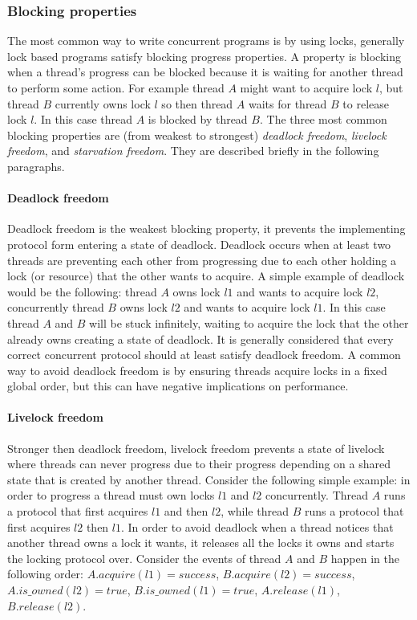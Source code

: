 \subsubsection{Blocking properties}
The most common way to write concurrent programs is by using locks,
generally lock based programs satisfy blocking progress properties.
A property is blocking when a thread's progress can be blocked because it is waiting
for another thread to perform some action.
For example thread $A$ might want to acquire lock $l$, but thread $B$ currently owns lock $l$
so then thread $A$ waits for thread $B$ to release lock $l$.
In this case thread $A$ is blocked by thread $B$.
The three most common blocking properties are (from weakest to
strongest) \emph{deadlock freedom}, \emph{livelock freedom},
and \emph{starvation freedom}.
They are described briefly in the following paragraphs.

\paragraph{Deadlock freedom}
Deadlock freedom is the weakest blocking property, it prevents the implementing protocol
form entering a state of deadlock.
Deadlock occurs when at least two threads are preventing each other from progressing
due to each other holding a lock (or resource) that the other wants to acquire.
A simple example of deadlock would be the following:
thread $A$ owns lock $l1$ and wants to acquire lock $l2$, concurrently
thread $B$ owns lock $l2$ and wants to acquire lock $l1$.
In this case thread $A$ and $B$ will be stuck infinitely, waiting to acquire the lock that the other
already owns creating a state of deadlock.
It is generally considered that every correct concurrent protocol should at least satisfy deadlock
freedom.
A common way to avoid deadlock freedom is by ensuring threads acquire locks in a fixed global order,
but this can have negative implications on performance.

\paragraph{Livelock freedom}
Stronger then deadlock freedom, livelock freedom prevents a state of livelock where threads
can never progress due to their progress depending on a shared state that is created by another thread.
Consider the following simple example:
in order to progress a thread must own locks $l1$ and $l2$ concurrently.
Thread $A$ runs a protocol that first acquires $l1$ and then $l2$, while thread
$B$ runs a protocol that first acquires $l2$ then $l1$.
In order to avoid deadlock when a thread notices that another thread owns a lock it wants, it
releases all the locks it owns and starts the locking protocol over.
Consider the events of thread $A$ and $B$ happen in the following order:
$A.acquire(l1) = success$, $B.acquire(l2) = success$, $A.is\_owned(l2) = true$, $B.is\_owned(l1) = true$,
$A.release(l1)$, $B.release(l2)$.



